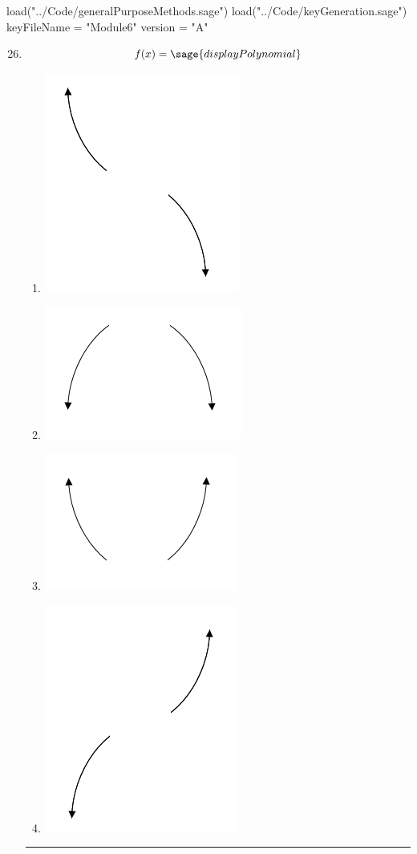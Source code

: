\documentclass[14pt]{article}
\newcommand{\litem}[1]{\item#1\hspace*{-1cm}\rule{\textwidth}{0.4pt}}
\begin{document}
\pagestyle{fancy}

\begin{sagesilent}
load("../Code/generalPurposeMethods.sage")
load("../Code/keyGeneration.sage")
keyFileName = "Module6"
version = "A"
\end{sagesilent}

\begin{enumerate}
\setcounter{enumi}{25}


\begin{sagesilent}
moduleNumber=6
problemNumber=26
load("../Code/polynomial/polyEndBehavior.sage")
\end{sagesilent}

\litem{ 

	\[ f(x) = \sage{displayPolynomial} \]

\begin{multicols}{4}
	\begin{enumerate}[label=\Alph*.]
		\item \begin{center} \includegraphics[width=.2\textwidth]{../Figures/endBehaviorNegativeOddA} \end{center}
    \columnbreak
		\item \begin{center} \includegraphics[width=.2\textwidth]{../Figures/endBehaviorNegativeEvenA}\end{center}
    \columnbreak
		\item \begin{center} \includegraphics[width=.2\textwidth]{../Figures/endBehaviorPositiveEvenA}\end{center}
    \columnbreak
		\item \begin{center} \includegraphics[width=.2\textwidth]{../Figures/endBehaviorPositiveOddA}\end{center}
	\end{enumerate}
\end{multicols}
}


\end{enumerate}
\end{document}
